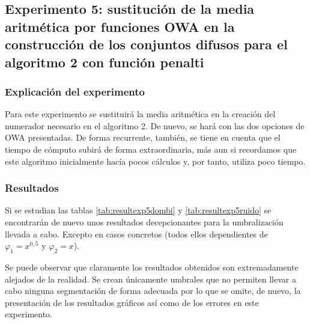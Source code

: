 \subsection{Experimento 5: sustitución de la media aritmética por funciones OWA en la construcción de los conjuntos difusos para el algoritmo 2 con función penalti}

\subsubsection{Explicación del experimento}
Para este experimento se sustituirá la media aritmética en la creación del numerador necesario en el algoritmo 2. De nuevo, se hará con las dos opciones de OWA presentadas. De forma recurrente, también, se tiene en cuenta que el tiempo de cómputo subirá de forma extraordinaria, más aun si recordamos que este algoritmo inicialmente hacía pocos cálculos y, por tanto, utiliza poco tiempo.

\subsubsection{Resultados}

Si se estudian las tablas \ref{tab:resultexp5dombi} y \ref{tab:resultexp5ruido} se encontrarán de nuevo unos resultados decepcionantes para la umbralización llevada a cabo. Excepto en casos concretos (todos ellos dependientes de $\varphi_1=x^{0,5} \text{ y }\varphi_2=x$).

Se puede observar que claramente los resultados obtenidos son extremadamente alejados de la realidad. Se crean únicamente umbrales que no permiten llevar a cabo ninguna segmentación de forma adecuada por lo que se omite, de nuevo, la presentación de los resultados gráficos así como de los errores en este experimento.

